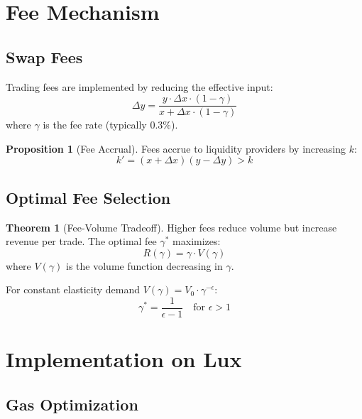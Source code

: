 \documentclass[11pt,a4paper]{article}
\theoremstyle{definition}
\newtheorem{theorem}{Theorem}
\newtheorem{proposition}{Proposition}
\begin{document}
\section{Fee Mechanism}

\subsection{Swap Fees}

Trading fees are implemented by reducing the effective input:
\begin{equation}
\Delta y = \frac{y \cdot \Delta x \cdot (1 - \gamma)}{x + \Delta x \cdot (1 - \gamma)}
\end{equation}
where $\gamma$ is the fee rate (typically 0.3\%).

\begin{proposition}[Fee Accrual]
Fees accrue to liquidity providers by increasing $k$:
\begin{equation}
k' = (x + \Delta x)(y - \Delta y) > k
\end{equation}
\end{proposition}

\subsection{Optimal Fee Selection}

\begin{theorem}[Fee-Volume Tradeoff]
Higher fees reduce volume but increase revenue per trade. The optimal fee $\gamma^*$ maximizes:
\begin{equation}
R(\gamma) = \gamma \cdot V(\gamma)
\end{equation}
where $V(\gamma)$ is the volume function decreasing in $\gamma$.
\end{theorem}

For constant elasticity demand $V(\gamma) = V_0 \cdot \gamma^{-\epsilon}$:
\begin{equation}
\gamma^* = \frac{1}{\epsilon - 1} \quad \text{for } \epsilon > 1
\end{equation}

\section{Implementation on Lux}

\subsection{Gas Optimization}
\end{document}
